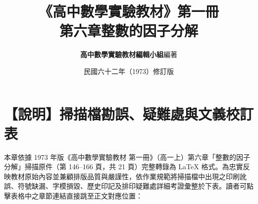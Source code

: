 \documentclass[a4paper,12pt,twoside]{article}
\title{\LARGE\textbf{《高中數學實驗教材》第一冊}\\[0.5em] \Large\textbf{第六章\quad 整數的因子分解}}
\author{\textbf{高中數學實驗教材編輯小組}\quad 編著}
\date{民國六十二年（1973）修訂版}
\begin{document}
\maketitle
\thispagestyle{firstpage}

\section*{【說明】掃描檔勘誤、疑難處與文義校訂表}
\label{sec:master_errata_notes}

本章依據 1973 年版《高中數學實驗教材 第一冊》（高一上）第六章「整數的因子分解」掃描原件（第 146--166 頁，共 21 頁）完整轉錄為 \LaTeX{} 格式。為忠實反映教材原始內容並兼顧排版品質與嚴謹性，依作業規範將掃描檔中出現之印刷訛誤、符號缺漏、字模損毀、歷史印記及排印疑難處詳細考證彙整於下表。讀者可點擊表格中之章節連結直接跳至正文對應位置：
\end{document}

